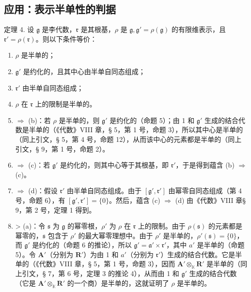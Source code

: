 \subsection{应用：表示半单性的判据}

定理 4. 设 \(\mathfrak{g}\) 是李代数，\(\mathfrak{r}\) 是其根基，\(\rho\) 是 \(\mathfrak{g},\mathfrak{g}' = \rho (\mathfrak{g})\) 的有限维表示，且 \(\mathfrak{r}' = \rho (\mathfrak{r})\)。则以下条件等价：

\begin{enumerate}
\def\labelenumi{(\alph{enumi})}
\item
  \(\rho\) 是半单的；
\item
  \(\mathfrak{g}'\) 是约化的，且其中心由半单自同态组成；
\item
  \(\mathfrak{r}'\) 由半单自同态组成；
\item
  \(\rho\) 在 \(\mathfrak{r}\) 上的限制是半单的。
\item
  \(\Rightarrow\) (b)：若 \(\rho\) 是半单的，则 \(\mathfrak{g}'\) 是约化的（命题 5）；由 1 和 \(\mathfrak{g}'\) 生成的结合代数是半单的（《代数》VIII 章，§ 5，第 1 号，命题 3），所以其中心是半单的（同上引文，§ 5，第 4 号，命题 12），从而该中心的元素都是半单的（同上引文，§ 9，第 1 号，命题 2）。
\item
  \(\Rightarrow\) (c)：若 \(\mathfrak{g}'\) 是约化的，则其中心等于其根基，即 \(\mathfrak{r}'\)，于是得到蕴含 (b) \(\Rightarrow\) (c)。
\item
  \(\Rightarrow\) (d)：假设 \(\mathfrak{r}'\) 由半单自同态组成。由于 \([\mathfrak{g}',\mathfrak{r}']\) 由幂零自同态组成（第 4 号，命题 6），有 \([\mathfrak{g}',\mathfrak{r}'] = \{0\}\)。然后，蕴含 (c) \(\Rightarrow\) (d) 由《代数》VIII 章§ 9，第 2 号，定理 1 得到。
\item
  \textgreater{} (a)：令 \(\mathfrak{s}\) 为 \(\mathfrak{g}\) 的幂零根，\(\rho'\) 为 \(\rho\) 在 \(\mathfrak{r}\) 上的限制。由于 \(\rho(\mathfrak{s})\) 的元素都是幂零的，\(\mathfrak{s}\) 包含于 \(\rho'\) 的最大幂零理想中。由于 \(\rho'\) 是半单的，\(\rho'(\mathfrak{s}) = \{0\}\)，而 \(\mathfrak{g}'\) 是约化的（命题 6 的推论），所以 \(\mathfrak{g}' = \mathfrak{a}' \times \mathfrak{r}'\)，其中 \(a'\) 是半单的（命题 5）。令 \(\mathbf{A}'\)（分别为 \(\mathbf{R}'\)）为由 1 和 \(a'\)（分别为 \(\mathfrak{r}'\)）生成的结合代数。它是半单的（《代数》VIII 章，§ 5，第 1 号，命题 3），因而 \(\mathbf{A}' \otimes_{\mathbb{K}} \mathbf{R}'\) 是半单的（同上引文，§ 7，第 6 号，定理 3 的推论 4），从而由 1 和 \(\mathfrak{g}'\) 生成的结合代数（它是 \(\mathbf{A}' \otimes_{\mathbb{K}} \mathbf{R}'\) 的一个商）是半单的，这就证明了 \(\rho\) 是半单的。
\end{enumerate}

